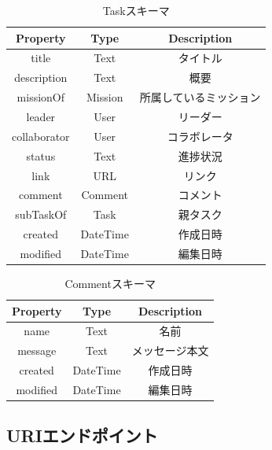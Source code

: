 \begin{table}[t]
 \caption{Taskスキーマ}
 \begin{center}
	 \begin{tabular}{ | c | c | c | } \hline
	    Property & Type & Description \\ \hline \hline
			title & Text & タイトル \\ \hline
			description & Text & 概要 \\ \hline
			missionOf & Mission & 所属しているミッション \\ \hline
			leader & User & リーダー \\ \hline
			collaborator & User & コラボレータ \\ \hline
			status & Text & 進捗状況 \\ \hline
			link & URL & リンク \\ \hline
			comment & Comment & コメント \\ \hline
			subTaskOf & Task & 親タスク \\ \hline
			created & DateTime & 作成日時 \\ \hline
			modified & DateTime & 編集日時 \\ \hline
	 \end{tabular}
	 \label{table:task_scheme}
 \end{center}
\end{table}

\begin{table}[t]
 \caption{Commentスキーマ}
 \begin{center}
	 \begin{tabular}{ | c | c | c | } \hline
	    Property & Type & Description \\ \hline \hline
			name & Text & 名前 \\ \hline
			message & Text & メッセージ本文 \\ \hline
			created & DateTime & 作成日時 \\ \hline
			modified & DateTime & 編集日時 \\ \hline
	 \end{tabular}
	 \label{table:comment_scheme}
 \end{center}
\end{table}

\subsection{URIエンドポイント}

